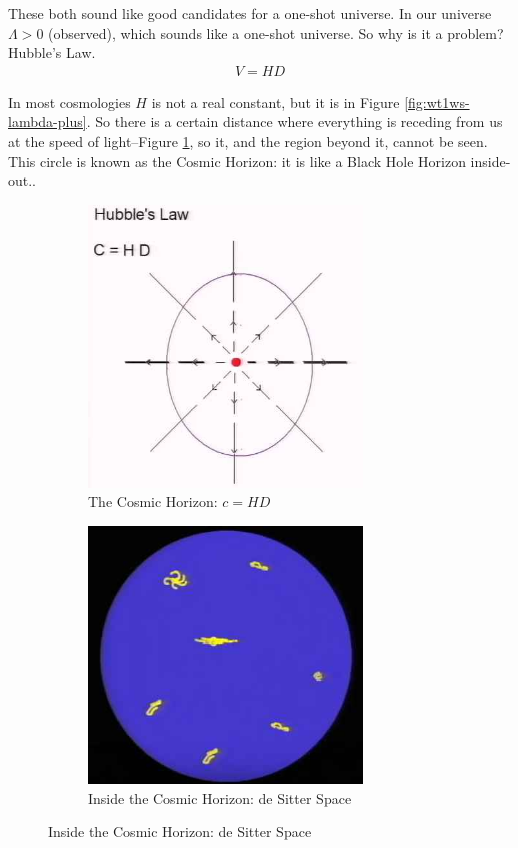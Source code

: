 \documentclass[]{article}
\begin{document}
These both sound like good candidates for a one-shot universe. In our universe  $\Lambda>0$ (observed), which sounds like a one-shot universe. So why is it a problem?
Hubble's Law.
\begin{align*}
	V = H D
\end{align*}

In most cosmologies $H$ is not a real constant, but it is in Figure \ref{fig:wt1ws-lambda-plus}. So there is a certain distance where everything is receding from us at the speed of light--Figure \ref{fig:wt1ws-hubbleC}, so it, and the region beyond it, cannot be seen. This circle is known as the Cosmic Horizon: it is like a Black Hole Horizon inside-out..

\begin{figure}[H]
	\begin{center}
		\caption{The Cosmic Horizon}
		\begin{subfigure}[t]{0.45\textwidth}
			\caption{The Cosmic Horizon: $c=HD$}\label{fig:wt1ws-hubbleC}
			\includegraphics[width=0.8\textwidth]{wt1ws-hubbleC}
		\end{subfigure}
		\begin{subfigure}[t]{0.45\textwidth}
			\caption{Inside the Cosmic Horizon: de Sitter Space}\label{fig:wt1ws-horizon}
			\includegraphics[width=0.8\textwidth]{wt1ws-horizon}

\end{subfigure}
\end{center}
\end{figure}
\end{document}
